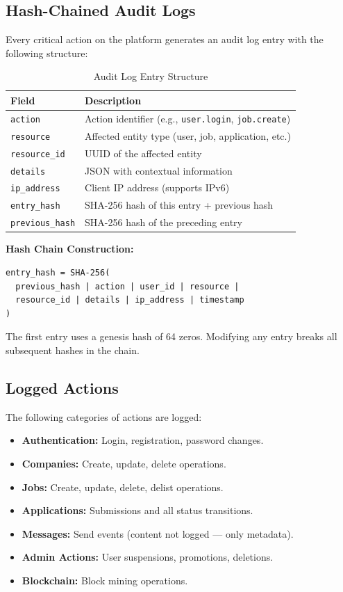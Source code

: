 \documentclass[12pt,a4paper]{article}
\begin{document}
\subsection{Hash-Chained Audit Logs}
Every critical action on the platform generates an audit log entry with the following structure:

\begin{table}[H]
\centering
\begin{tabular}{ll}
\toprule
\textbf{Field} & \textbf{Description} \\
\midrule
\texttt{action} & Action identifier (e.g., \texttt{user.login}, \texttt{job.create}) \\
\texttt{resource} & Affected entity type (user, job, application, etc.) \\
\texttt{resource\_id} & UUID of the affected entity \\
\texttt{details} & JSON with contextual information \\
\texttt{ip\_address} & Client IP address (supports IPv6) \\
\texttt{entry\_hash} & SHA-256 hash of this entry + previous hash \\
\texttt{previous\_hash} & SHA-256 hash of the preceding entry \\
\bottomrule
\end{tabular}
\caption{Audit Log Entry Structure}
\end{table}

\textbf{Hash Chain Construction:}
\begin{lstlisting}
entry_hash = SHA-256(
  previous_hash | action | user_id | resource |
  resource_id | details | ip_address | timestamp
)
\end{lstlisting}

The first entry uses a genesis hash of 64 zeros. Modifying any entry breaks all subsequent hashes in the chain.

\subsection{Logged Actions}
The following categories of actions are logged:
\begin{itemize}
  \item \textbf{Authentication:} Login, registration, password changes.
  \item \textbf{Companies:} Create, update, delete operations.
  \item \textbf{Jobs:} Create, update, delete, delist operations.
  \item \textbf{Applications:} Submissions and all status transitions.
  \item \textbf{Messages:} Send events (content not logged --- only metadata).
  \item \textbf{Admin Actions:} User suspensions, promotions, deletions.
  \item \textbf{Blockchain:} Block mining operations.
\end{itemize}
\end{document}
